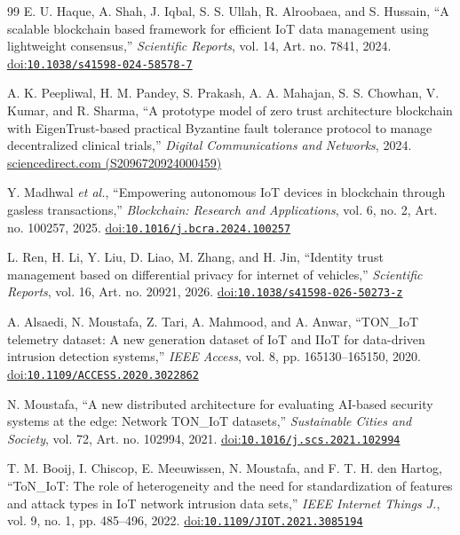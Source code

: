 \begin{thebibliography}{99}
E. U. Haque, A. Shah, J. Iqbal, S. S. Ullah, R. Alroobaea, and S. Hussain, ``A scalable blockchain based framework for efficient IoT data management using lightweight consensus,'' \emph{Scientific Reports}, vol. 14, Art. no. 7841, 2024. \href{https://doi.org/10.1038/s41598-024-58578-7}{doi:\nolinkurl{10.1038/s41598-024-58578-7}}

A. K. Peepliwal, H. M. Pandey, S. Prakash, A. A. Mahajan, S. S. Chowhan, V. Kumar, and R. Sharma, ``A prototype model of zero trust architecture blockchain with EigenTrust-based practical Byzantine fault tolerance protocol to manage decentralized clinical trials,'' \emph{Digital Communications and Networks}, 2024. \href{https://www.sciencedirect.com/science/article/pii/S2096720924000459}{sciencedirect.com (S2096720924000459)}

Y. Madhwal \emph{et al.}, ``Empowering autonomous IoT devices in blockchain through gasless transactions,'' \emph{Blockchain: Research and Applications}, vol. 6, no. 2, Art. no. 100257, 2025. \href{https://doi.org/10.1016/j.bcra.2024.100257}{doi:\nolinkurl{10.1016/j.bcra.2024.100257}}

L. Ren, H. Li, Y. Liu, D. Liao, M. Zhang, and H. Jin, ``Identity trust management based on differential privacy for internet of vehicles,'' \emph{Scientific Reports}, vol. 16, Art. no. 20921, 2026. \href{https://doi.org/10.1038/s41598-026-50273-z}{doi:\nolinkurl{10.1038/s41598-026-50273-z}}

A. Alsaedi, N. Moustafa, Z. Tari, A. Mahmood, and A. Anwar, ``TON\_IoT telemetry dataset: A new generation dataset of IoT and IIoT for data-driven intrusion detection systems,'' \emph{IEEE Access}, vol. 8, pp. 165130--165150, 2020. \href{https://doi.org/10.1109/ACCESS.2020.3022862}{doi:\nolinkurl{10.1109/ACCESS.2020.3022862}}

N. Moustafa, ``A new distributed architecture for evaluating AI-based security systems at the edge: Network TON\_IoT datasets,'' \emph{Sustainable Cities and Society}, vol. 72, Art. no. 102994, 2021. \href{https://doi.org/10.1016/j.scs.2021.102994}{doi:\nolinkurl{10.1016/j.scs.2021.102994}}

T. M. Booij, I. Chiscop, E. Meeuwissen, N. Moustafa, and F. T. H. den Hartog, ``ToN\_IoT: The role of heterogeneity and the need for standardization of features and attack types in IoT network intrusion data sets,'' \emph{IEEE Internet Things J.}, vol. 9, no. 1, pp. 485--496, 2022. \href{https://doi.org/10.1109/JIOT.2021.3085194}{doi:\nolinkurl{10.1109/JIOT.2021.3085194}}


\end{thebibliography}
